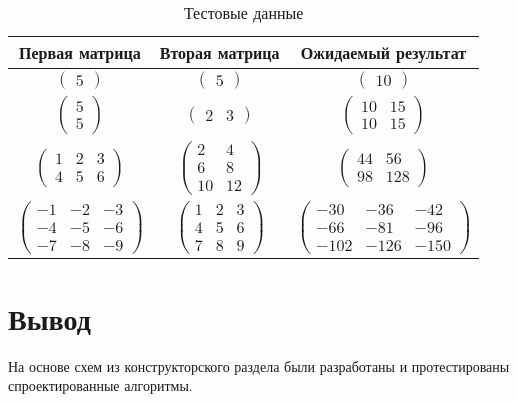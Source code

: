\begin{table}[h!]
	\begin{center}
		\caption{\label{tbl:test}Тестовые данные}
		\begin{tabular}{|c|c|c|}
			\hline
			\bfseries Первая матрица& \bfseries Вторая матрица & \bfseries Ожидаемый результат  \\ 
			\hline

			$\begin{pmatrix}
			5
			\end{pmatrix}$ &
			$\begin{pmatrix}
			5
			\end{pmatrix}$ &
			$\begin{pmatrix}
			10
			\end{pmatrix}$ \\ \hline

			$\begin{pmatrix}
			5 \\
			5 
			\end{pmatrix}$ &
			$\begin{pmatrix}
			2 & 3
			\end{pmatrix}$ &
			$\begin{pmatrix}
			10 & 15\\
			10 & 15
			\end{pmatrix}$ \\ \hline

			$\begin{pmatrix}
			1 & 2 & 3\\
			4 & 5 & 6
			\end{pmatrix}$ &
			$\begin{pmatrix}
			2 & 4\\
			6 & 8\\
			10 & 12
			\end{pmatrix}$ &
			$\begin{pmatrix}
			44 & 56\\
			98 & 128
			\end{pmatrix}$ \\ \hline

			$\begin{pmatrix}
			-1 & -2 & -3\\
			-4 & -5 & -6\\
			-7 & -8 & -9
			\end{pmatrix}$ &
			$\begin{pmatrix}
			1 & 2 & 3\\
			4 & 5 & 6\\
			7 & 8 & 9
			\end{pmatrix}$ &
			$\begin{pmatrix}
			-30 & -36 & -42\\
			-66 & -81 & -96\\
			-102 & -126 & -150
			\end{pmatrix}$ \\ \hline

		\end{tabular}
	\end{center}
\end{table}

\section*{Вывод}

На основе схем из конструкторского раздела были разработаны и протестированы спроектированные алгоритмы.
